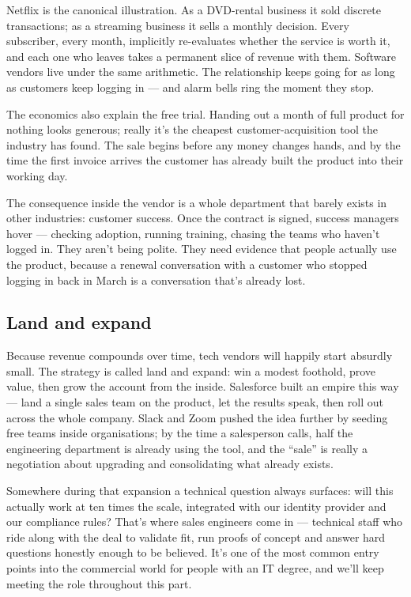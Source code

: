 Netflix is the canonical illustration. As a DVD-rental business it sold discrete transactions; as a streaming business it sells a monthly decision. Every subscriber, every month, implicitly re-evaluates whether the service is worth it, and each one who leaves takes a permanent slice of revenue with them. Software vendors live under the same arithmetic. The relationship keeps going for as long as customers keep logging in — and alarm bells ring the moment they stop.


The economics also explain the free trial. Handing out a month of full product for nothing looks generous; really it's the cheapest customer-acquisition tool the industry has found. The sale begins before any money changes hands, and by the time the first invoice arrives the customer has already built the product into their working day.


The consequence inside the vendor is a whole department that barely exists in other industries: customer success. Once the contract is signed, success managers hover — checking adoption, running training, chasing the teams who haven't logged in. They aren't being polite. They need evidence that people actually use the product, because a renewal conversation with a customer who stopped logging in back in March is a conversation that's already lost.



\subsection{Land and expand}


Because revenue compounds over time, tech vendors will happily start absurdly small. The strategy is called land and expand: win a modest foothold, prove value, then grow the account from the inside. Salesforce built an empire this way — land a single sales team on the product, let the results speak, then roll out across the whole company. Slack and Zoom pushed the idea further by seeding free teams inside organisations; by the time a salesperson calls, half the engineering department is already using the tool, and the ``sale'' is really a negotiation about upgrading and consolidating what already exists.


Somewhere during that expansion a technical question always surfaces: will this actually work at ten times the scale, integrated with our identity provider and our compliance rules? That's where sales engineers come in — technical staff who ride along with the deal to validate fit, run proofs of concept and answer hard questions honestly enough to be believed. It's one of the most common entry points into the commercial world for people with an IT degree, and we'll keep meeting the role throughout this part.



